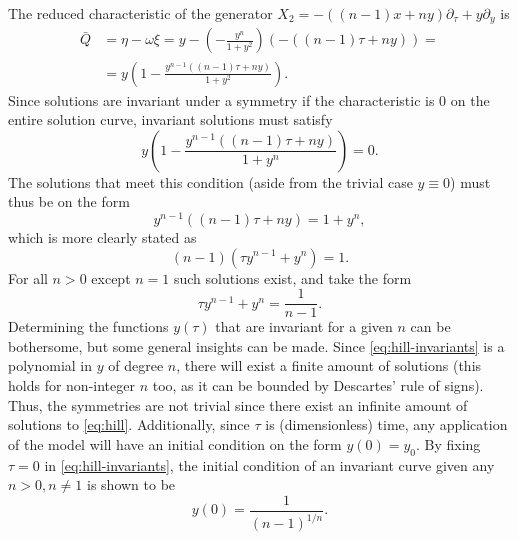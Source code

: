 The reduced characteristic of the generator \(X_2 = - \left( (n-1) x + n y \right) \partial_\tau + y \partial_y\) is
\begin{align}
  \bar{Q} &= 
  \eta - \omega \xi = 
  y - \left( -\frac{y^n}{1+y^2} \right) \left( - \left( (n-1) \tau + n y \right) \right) =\\
  &= y \left(1 -\frac{y^{n-1} \left( (n-1) \tau + n y \right)}{1+y^2} \right).
\end{align}
Since solutions are invariant under a symmetry if the characteristic is 0 on the entire solution curve, invariant solutions must satisfy
\begin{equation}
  y \left(1 -\frac{y^{n-1} \left( (n-1) \tau + n y \right)}{1+y^n} \right) = 0.
\end{equation}
The solutions that meet this condition (aside from the trivial case \(y \equiv 0\)) must thus be on the form
\begin{equation}
  y^{n-1} \left( (n-1) \tau + n y \right) = 1+y^n,
\end{equation}
which is more clearly stated as
\begin{equation}
  (n-1) \left( \tau y^{n-1} + y^n \right) = 1.
\end{equation}
For all \(n>0\) except \(n=1\) such solutions exist, and take the form
\begin{equation} \label{eq:hill-invariants}
  \tau y^{n-1} + y^n = \frac{1}{n-1}.
\end{equation}
Determining the functions \(y(\tau)\) that are invariant for a given \(n\) can be bothersome, but some general insights can be made.
Since \cref{eq:hill-invariants} is a polynomial in \(y\) of degree \(n\), there will exist a finite amount of solutions (this holds for non-integer \(n\) too, as it can be bounded by Descartes' rule of signs). %
Thus, the symmetries are not trivial since there exist an infinite amount of solutions to \cref{eq:hill}.
Additionally, since \(\tau\) is (dimensionless) time, any application of the model will have an initial condition on the form \(y(0) = y_0\).
By fixing \(\tau=0\) in \cref{eq:hill-invariants}, the initial condition of an invariant curve given any \(n>0, n\neq1\) is shown to be
\begin{equation}
  y(0) =\frac{1}{(n-1)^{1/n}}.
\end{equation}
